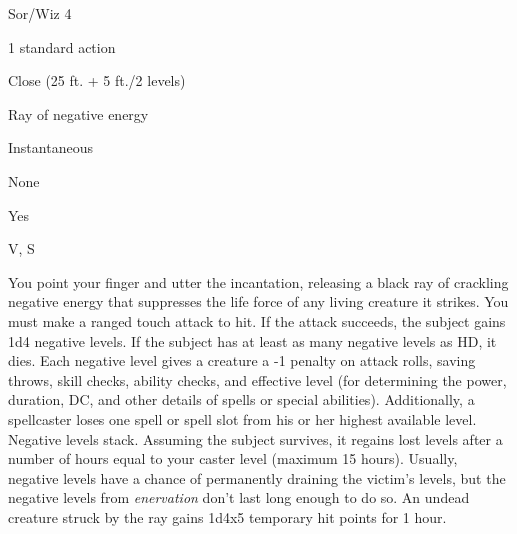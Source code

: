 
\begin{description*}
\item[Level:] Sor/Wiz 4
\item[Casting Time:] 1 standard action
\item[Range:] Close (25 ft. + 5 ft./2 levels)
\item[Effect:] Ray of negative energy
\item[Duration:] Instantaneous
\item[Saving Throw:] None
\item[Spell Resistance:] Yes
\item[Components:] V, S
\end{description*}

You point your finger and utter the incantation, releasing a black ray of crackling
negative energy that suppresses the life force of any living creature it strikes.
You must make a ranged touch attack to hit. If the attack succeeds, the subject
gains 1d4 negative levels.
If the subject has at least as many negative levels as HD, it dies. Each negative
level gives a creature a -1 penalty on attack rolls, saving throws, skill checks,
ability checks, and effective level (for determining the power, duration, DC, and
other details of spells or special abilities).
Additionally, a spellcaster loses one spell or spell slot from his or her highest
available level. Negative levels stack.
Assuming the subject survives, it regains lost levels after a number of hours equal
to your caster level (maximum 15 hours). Usually, negative levels have a chance
of permanently draining the victim's levels, but the negative levels from \textit{enervation
}don't last long enough to do so.
An undead creature struck by the ray gains 1d4x5 temporary hit points for 1 hour.
